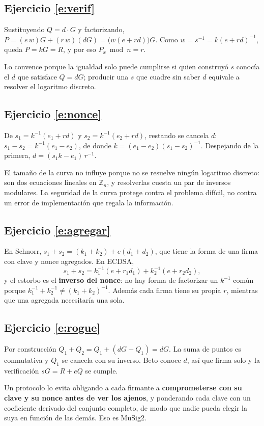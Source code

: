 \documentclass[11pt,a4paper]{article}
\theoremstyle{definition}
\theoremstyle{plain}
\theoremstyle{remark}
\begin{document}
\subsection*{Ejercicio \ref{e:verif}}
Sustituyendo $Q = d\cdot G$ y factorizando,
$P = (e\,w)G + (r\,w)(dG) = \bigl(w(e+rd)\bigr)G$. Como
$w = s^{-1} = k(e+rd)^{-1}$, queda $P = kG = R$, y por eso $P_x \bmod n = r$.

Lo convence porque la igualdad solo puede cumplirse si quien construyó $s$
conocía el $d$ que satisface $Q = dG$; producir una $s$ que cuadre sin saber $d$
equivale a resolver el logaritmo discreto.

\subsection*{Ejercicio \ref{e:nonce}}
De $s_1 = k^{-1}(e_1 + rd)$ y $s_2 = k^{-1}(e_2 + rd)$, restando se cancela $d$:
$s_1 - s_2 = k^{-1}(e_1-e_2)$, de donde $k = (e_1-e_2)(s_1-s_2)^{-1}$. Despejando
de la primera, $d = (s_1 k - e_1)\,r^{-1}$.

El tamaño de la curva no influye porque no se resuelve ningún logaritmo discreto:
son dos ecuaciones lineales en $\mathbb{Z}_n$, y resolverlas cuesta un par de
inversos modulares. La seguridad de la curva protege contra el problema difícil,
no contra un error de implementación que regala la información.

\subsection*{Ejercicio \ref{e:agregar}}
En Schnorr, $s_1+s_2 = (k_1+k_2) + e(d_1+d_2)$, que tiene la forma de una firma
con clave y nonce agregados. En ECDSA,
\[
  s_1 + s_2 = k_1^{-1}(e + r_1 d_1) + k_2^{-1}(e + r_2 d_2),
\]
y el estorbo es el \textbf{inverso del nonce}: no hay forma de factorizar un
$k^{-1}$ común porque $k_1^{-1} + k_2^{-1} \ne (k_1+k_2)^{-1}$. Además cada firma
tiene su propia $r$, mientras que una agregada necesitaría una sola.

\subsection*{Ejercicio \ref{e:rogue}}
Por construcción $Q_1 + Q_2 = Q_1 + (dG - Q_1) = dG$. La suma de puntos es
conmutativa y $Q_1$ se cancela con su inverso. Beto conoce $d$, así que firma
solo y la verificación $sG = R + eQ$ se cumple.

Un protocolo lo evita obligando a cada firmante a \textbf{comprometerse con su
clave y su nonce antes de ver los ajenos}, y ponderando cada clave con un
coeficiente derivado del conjunto completo, de modo que nadie pueda elegir la
suya en función de las demás. Eso es MuSig2.
\end{document}
